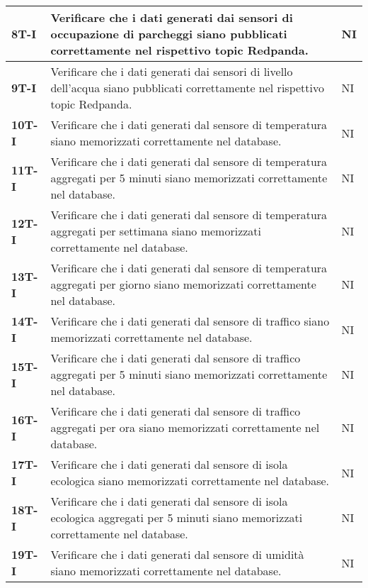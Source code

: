 \begin{longtable}{|>{\raggedright\arraybackslash}m{}|>{\raggedright\arraybackslash}m{}|>{\raggedright\arraybackslash}m{}|}
	\hline
	\textbf{8T-I}   & Verificare che i dati generati dai sensori di occupazione di parcheggi siano pubblicati correttamente nel rispettivo topic Redpanda. & NI             \\
	\hline
	\textbf{9T-I}   & Verificare che i dati generati dai sensori di livello dell'acqua siano pubblicati correttamente nel rispettivo topic Redpanda.       & NI             \\
	\hline
	\textbf{10T-I}  & Verificare che i dati generati dal sensore di temperatura siano memorizzati correttamente nel database.                              & NI             \\
	\hline
	\textbf{11T-I}  & Verificare che i dati generati dal sensore di temperatura aggregati per 5 minuti siano memorizzati correttamente nel database.       & NI             \\
	\hline
	\textbf{12T-I}  & Verificare che i dati generati dal sensore di temperatura aggregati per settimana siano memorizzati correttamente nel database.      & NI             \\
	\hline
	\textbf{13T-I}  & Verificare che i dati generati dal sensore di temperatura aggregati per giorno siano memorizzati correttamente nel database.         & NI             \\
	\hline
	\textbf{14T-I}  & Verificare che i dati generati dal sensore di traffico siano memorizzati correttamente nel database.                                 & NI             \\
	\hline
	\textbf{15T-I}  & Verificare che i dati generati dal sensore di traffico aggregati per 5 minuti siano memorizzati correttamente nel database.          & NI             \\
	\hline
	\textbf{16T-I}  & Verificare che i dati generati dal sensore di traffico aggregati per ora siano memorizzati correttamente nel database.               & NI             \\
	\hline
	\textbf{17T-I}  & Verificare che i dati generati dal sensore di isola ecologica siano memorizzati correttamente nel database.                          & NI             \\
	\hline
	\textbf{18T-I}  & Verificare che i dati generati dal sensore di isola ecologica aggregati per 5 minuti siano memorizzati correttamente nel database.   & NI             \\
	\hline
	\textbf{19T-I}  & Verificare che i dati generati dal sensore di umidità siano memorizzati correttamente nel database.                                  & NI             \\

\end{longtable}
